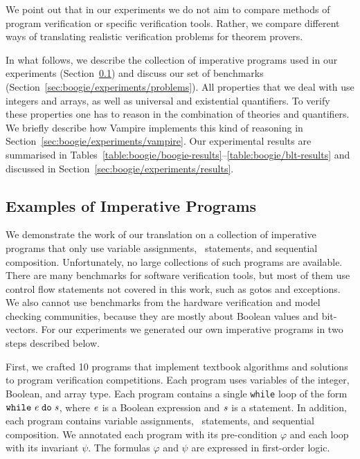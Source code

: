 We point out that in our experiments we do not aim to compare methods of program verification or specific verification tools. Rather, we compare different ways of translating realistic verification problems for theorem provers.

In what follows, we describe the collection of imperative programs used in our experiments (Section~\ref{sec:boogie/experiments/programs}) and discuss our set of benchmarks (Section~\ref{sec:boogie/experiments/problems}). All properties that we deal with use integers and arrays, as well as universal and existential quantifiers. To verify these properties one has to reason in the combination of theories and quantifiers. We briefly describe how Vampire implements this kind of reasoning in Section~\ref{sec:boogie/experiments/vampire}. Our experimental results are summarised in Tables~\ref{table:boogie/boogie-results}--\ref{table:boogie/blt-results} and discussed in Section~\ref{sec:boogie/experiments/results}.

\newcommand{\bad}{\mathit{bad}}
\newcommand{\iter}{i}

\subsection{Examples of Imperative Programs}\label{sec:boogie/experiments/programs}
We demonstrate the work of our translation on a collection of imperative programs that only use variable assignments, \ITE\ statements, and sequential composition. Unfortunately, no large collections of such programs are available. There are many benchmarks for software verification tools, but most of them use control flow statements not covered in this work, such as gotos and exceptions. We also cannot use benchmarks from the hardware verification and model checking communities, because they are mostly about Boolean values and bit-vectors. For our experiments we generated our own imperative programs in two steps described below.

First, we crafted 10 programs that implement textbook algorithms and solutions to program verification competitions. Each program uses variables of the integer, Boolean, and array type. Each program contains a single \verb'while' loop
of the form $\mathtt{while}\;{\mathit{e}}\;\mathtt{do}\;{\mathit{s}}$, where $\mathit{e}$ is a Boolean expression and $\mathit{s}$ is a statement. In addition, each program contains 
variable assignments, \ITE\ statements, and sequential composition. We annotated each program with its pre-condition $\varphi$ and each loop with its invariant $\psi$. The formulas $\varphi$ and $\psi$ are expressed in first-order logic.

